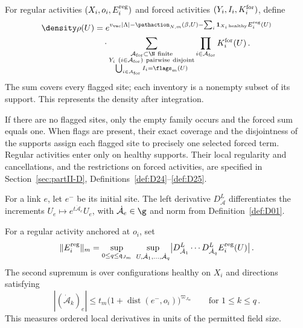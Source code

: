 \begin{definition}\label{def:D06}
For regular activities $(X_i,o_i,E_i^{\rm reg})$ and forced activities $(Y_i,I_i,K_i^{\rm for})$, define
\begin{align*}
\density\rho(U)&=
e^{v_{\rm vac}|\Lambda|-\pathaction_{N,m}(\beta,U)
-\sum_i\mathbf1_{X_i\,\mathrm{healthy}}E_i^{\rm reg}(U)}\\
&\quad\cdot\sum_{\substack{\mathcal A_{\rm for}\subset\N\ {\rm finite}\\
Y_i\ (i\in\mathcal A_{\rm for})\ {\rm pairwise\ disjoint}\\
\bigcup_{i\in\mathcal A_{\rm for}}I_i=\flags_m(U)}}
\prod_{i\in\mathcal A_{\rm for}}K_i^{\rm for}(U)\,.
\end{align*}
The sum covers every flagged site; each inventory is a nonempty subset of its support. This represents the density after integration.
\end{definition}

If there are no flagged sites, only the empty family occurs and the forced sum equals one. When flags are present, their exact coverage and the disjointness of the supports assign each flagged site to precisely one selected forced term. Regular activities enter only on healthy supports. Their local regularity and cancellations, and the restrictions on forced activities, are specified in Section~\ref{sec:partII-D}, Definitions~\ref{def:D24}--\ref{def:D25}.

For a link $e$, let $e^-$ be its initial site. The left derivative $D^L_{\dot{\mathcal A}}$ differentiates the increments $U_e\mapsto e^{t\dot{\mathcal A}_e}U_e$, with $\dot{\mathcal A}_e\in\g$ and norm from Definition~\ref{def:D01}.

\begin{definition}\label{def:D05a}
For a regular activity anchored at $o_i$, set
\begin{equation*}
\|E_i^{\rm reg}\|_m=
\sup_{0\le q\le\mathfrak q_{J_m}}\ \sup_{U,\dot{\mathcal A}_1,\ldots,\dot{\mathcal A}_q}
\bigl|D^L_{\dot{\mathcal A}_1}\cdots D^L_{\dot{\mathcal A}_q}E_i^{\rm reg}(U)\bigr|\,.
\end{equation*}
The second supremum is over configurations healthy on $X_i$ and directions satisfying
\begin{equation*}
|(\dot{\mathcal A}_k)_e|\le t_m\bigl(1+\operatorname{dist}(e^-,o_i)\bigr)^{\varpi_{J_m}}\qquad\text{for }1\le k\le q\,.
\end{equation*}
This measures ordered local derivatives in units of the permitted field size.
\end{definition}

